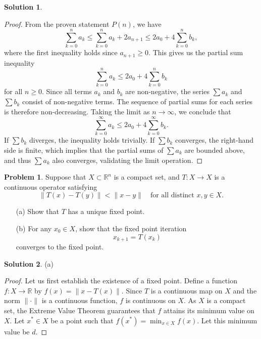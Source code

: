 \documentclass[12pt]{article}
\theoremstyle{definition}
\newtheorem*{solution}{\normalfont\textbf{Solution}}
\newtheorem*{Problem}{\noindent\textbf{Problem}}
\begin{document}
\begin{enumerate}[leftmargin=*]
\begin{solution}
\begin{proof}
                From the proven statement \(P(n)\), we have
                \[
                \sum_{k=0}^{n} a_k \leq \sum_{k=0}^{n} a_k + 2a_{n+1} \leq 2a_0 + 4\sum_{k=0}^{n} b_k,
                \]
                where the first inequality holds since \(a_{n+1} \geq 0\). This gives us the partial sum inequality
                \[
                \sum_{k=0}^{n} a_k \leq 2a_0 + 4\sum_{k=0}^{n} b_k
                \]
                for all \(n \geq 0\). Since all terms \(a_k\) and \(b_k\) are non-negative, the series \(\sum a_k\) and \(\sum b_k\) consist of non-negative terms. The sequence of partial sums for each series is therefore non-decreasing. Taking the limit as \(n \to \infty\), we conclude that
                \[
                \sum_{k = 0}^{\infty} a_k \leq 2a_0 + 4\sum_{k = 0}^{\infty} b_k.
                \]
                If \(\sum b_k\) diverges, the inequality holds trivially. If \(\sum b_k\) converges, the right-hand side is finite, which implies that the partial sums of \(\sum a_k\) are bounded above, and thus \(\sum a_k\) also converges, validating the limit operation.
            \end{proof}
    \end{solution}
    \item \begin{Problem}
            Suppose that \( X \subset \mathbb{R}^n \) is a compact set, and \( T : X \to X \) is a continuous operator satisfying
            \[
            \| T(x) - T(y) \| < \| x - y \| \quad \text{for all distinct } x, y \in X.
            \]
            \begin{enumerate}
                \item[(a)] Show that \( T \) has a unique fixed point.
                \item[(b)] For any \( x_0 \in X \), show that the fixed point iteration
                \[
                x_{k + 1} = T(x_k)
                \]
                converges to the fixed point.
            \end{enumerate}
        \end{Problem}
        \begin{solution}
        \item[(a)]
            \begin{proof}
                Let us first establish the existence of a fixed point. Define a function \( f: X \to \mathbb{R} \) by \( f(x) = \|x - T(x)\| \). Since \( T \) is a continuous map on \( X \) and the norm \( \|\cdot\| \) is a continuous function, \( f \) is continuous on \( X \). As \( X \) is a compact set, the Extreme Value Theorem guarantees that \( f \) attains its minimum value on \( X \). Let \( x^* \in X \) be a point such that \( f(x^*) = \min_{x \in X} f(x) \). Let this minimum value be \( d \).


\end{proof}
\end{solution}
\end{enumerate}
\end{document}
